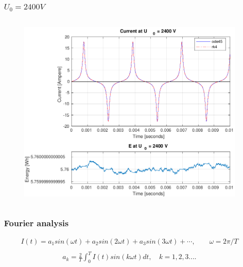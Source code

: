 \documentclass[aspectratio=1610]{beamer}
\begin{document}
\begin{frame}
\frametitle{$U_{0}= 2400V$}
\begin{columns}
		\begin{figure}		
			\includegraphics[scale=0.25]{figs/2400V + E.png}
      	\end{figure}
\end{columns} 
\end{frame}
\begin{frame}
\frametitle{Fourier analysis}
\large
\begin{align*}
I(t)=a_{1}sin(\omega t)+a_{2}sin(2\omega t)+a_{3}sin(3\omega t)+\cdots, \quad  \quad \omega = 2\pi/T\\
\end{align*}
\begin{align*}
a_{k} = \frac{2}{T}\int_{0}^{T} I(t)sin(k\omega t)dt,\quad k=1,2,3....
\end{align*}
\end{frame}
\end{document}

